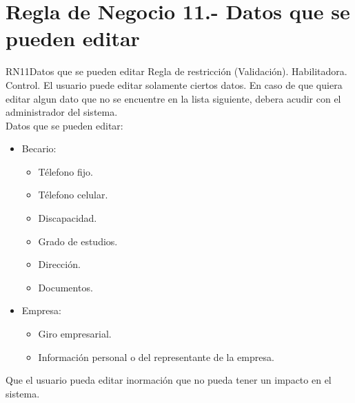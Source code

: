 \section{Regla de Negocio 11.- Datos que se pueden editar}

\begin{BussinesRule}{RN11}{Datos que se pueden editar}
	\BRitem[Tipo:] Regla de restricción (Validación).
	\BRitem[Clase:] Habilitadora. 
	\BRitem[Nivel:] Control. %
	\BRitem[Descripción:] El usuario puede editar solamente ciertos datos. En caso de que quiera editar algun dato que no se encuentre en la lista siguiente, debera acudir con el administrador del sistema.\\
	Datos que se pueden editar:
	\begin{itemize}
	    \item Becario:
	        \begin{itemize}
	            \item Télefono fijo.
	            \item Télefono celular.
	            \item Discapacidad.
	            \item Grado de estudios.
	            \item Dirección.
	            \item Documentos.
	        \end{itemize}
	   \item Empresa:
	        \begin{itemize}
	            \item Giro empresarial.
	            \item Información personal o del representante de la empresa.
	        \end{itemize}
	\end{itemize}
	\BRitem[Motivación:] Que el usuario pueda editar inormación que no pueda tener un impacto en el sistema. 

\end{BussinesRule}
